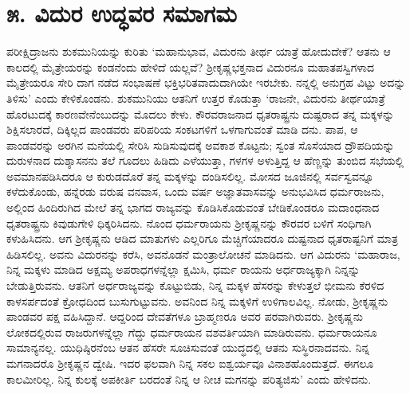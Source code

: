 
\chapter{೫. ವಿದುರ ಉದ್ಧವರ ಸಮಾಗಮ}

ಪರೀಕ್ಷಿದ್ರಾಜನು ಶುಕಮುನಿಯನ್ನು ಕುರಿತು ‘ಮಹಾನುಭಾವ, ವಿದುರನು ತೀರ್ಥ ಯಾತ್ರೆ ಹೋದುದೇಕೆ? ಆತನು ಆ ಕಾಲದಲ್ಲಿ ಮೈತ್ರೇಯರನ್ನು ಕಂಡನೆಂದು ಹೇಳಿದೆ ಯಲ್ಲವೆ? ಶ್ರೀಕೃಷ್ಣಭಕ್ತನಾದ ವಿದುರನೂ ಮಹಾತಪಸ್ವಿಗಳಾದ ಮೈತ್ರೇಯರೂ ಸೇರಿ ದಾಗ ನಡೆದ ಸಂಭಾಷಣೆ ಭಕ್ತಿಭರಿತವಾದುದಾಗಿಯೇ ಇರಬೇಕು. ನನ್ನಲ್ಲಿ ಅನುಗ್ರಹ ವಿಟ್ಟು ಅದನ್ನು ತಿಳಿಸು’ ಎಂದು ಕೇಳಿಕೊಂಡನು. ಶುಕಮುನಿಯು ಆತನಿಗೆ ಉತ್ತರ ಕೊಡುತ್ತಾ ‘ರಾಜನೇ, ವಿದುರನು ತೀರ್ಥಯಾತ್ರೆ ಹೊರಟುದಕ್ಕೆ ಕಾರಣವೇನೆಂಬುದನ್ನು ಮೊದಲು ಕೇಳು. ಕೌರವರಾಜನಾದ ಧೃತರಾಷ್ಟ್ರನು ದುಷ್ಟರಾದ ತನ್ನ ಮಕ್ಕಳನ್ನು ಶಿಕ್ಷಿಸಲಾರದೆ, ದಿಕ್ಕಿಲ್ಲದ ಪಾಂಡವರು ಪರಿಪರಿಯ ಸಂಕಟಗಳಿಗೆ ಒಳಗಾಗುವಂತೆ ಮಾಡಿ ದನು. ಪಾಪ, ಆ ಪಾಂಡವರನ್ನು ಅರಗಿನ ಮನೆಯಲ್ಲಿ ಸೇರಿಸಿ ಸುಡಿಸುವುದಕ್ಕೆ ಅವಕಾಶ ಕೊಟ್ಟನು; ಸ್ವಂತ ಸೊಸೆಯಾದ ದ್ರೌಪದಿಯನ್ನು ದುರುಳನಾದ ದುಶ್ಶಾಸನನು ತಲೆ ಗೂದಲು ಹಿಡಿದು ಎಳೆಯುತ್ತಾ, ಗಳಗಳ ಅಳುತ್ತಿದ್ದ ಆ ಹೆಣ್ಣನ್ನು ತುಂಬಿದ ಸಭೆಯಲ್ಲಿ ಅವಮಾನಪಡಿಸಿದರೂ ಆ ಕುರುಡದೊರೆ ತನ್ನ ಮಕ್ಕಳನ್ನು ದಂಡಿಸಲಿಲ್ಲ. ಮೋಸದ ಜೂಜಿನಲ್ಲಿ ಸರ್ವಸ್ವವನ್ನೂ ಕಳೆದುಕೊಂಡು, ಹನ್ನೆರಡು ವರುಷ ವನವಾಸ, ಒಂದು ವರ್ಷ ಅಜ್ಞಾತವಾಸವನ್ನು ಅನುಭವಿಸಿದ ಧರ್ಮರಾಜನು, ಅಲ್ಲಿಂದ ಹಿಂದಿರುಗಿದ ಮೇಲೆ ತನ್ನ ಭಾಗದ ರಾಜ್ಯವನ್ನು ಕೊಡಿಸಿಕೊಡುವಂತೆ ಬೇಡಿಕೊಂಡರೂ ಮದಾಂಧನಾದ ಧೃತರಾಷ್ಟ್ರನು ಕಿವುಡುಗೇಳಿ ಧಿಕ್ಕರಿಸಿದನು. ನೊಂದ ಧರ್ಮರಾಯನು ಶ್ರೀಕೃಷ್ಣನನ್ನು ಕೌರವರ ಬಳಿಗೆ ಸಂಧಿಗಾಗಿ ಕಳುಹಿಸಿದನು. ಆಗ ಶ್ರೀಕೃಷ್ಣನು ಆಡಿದ ಮಾತುಗಳು ಎಲ್ಲರಿಗೂ ಮೆಚ್ಚಿಗೆಯಾದರೂ ದುಷ್ಟನಾದ ಧೃತರಾಷ್ಟನಿಗೆ ಮಾತ್ರ ಹಿಡಿಸಲಿಲ್ಲ. ಅವನು ವಿದುರನನ್ನು ಕರೆಸಿ, ಅವನೊಡನೆ ಮಂತ್ರಾಲೋಚನೆ ಮಾಡಿದನು. ಆಗ ವಿದುರನು ‘ಮಹಾರಾಜ, ನಿನ್ನ ಮಕ್ಕಳು ಮಾಡಿದ ಅಕ್ಷಮ್ಯ ಅಪರಾಧಗಳನ್ನೆಲ್ಲಾ ಕ್ಷಮಿಸಿ, ಧರ್ಮ ರಾಯನು ಅರ್ಧರಾಜ್ಯಕ್ಕಾಗಿ ನಿನ್ನನ್ನು ಬೇಡುತ್ತಿರುವನು. ಆತನಿಗೆ ಅರ್ಧರಾಜ್ಯವನ್ನು ಕೊಟ್ಟುಬಿಡು, ನಿನ್ನ ಮಕ್ಕಳ ಹೆಸರನ್ನು ಕೇಳುತ್ತಲೆ ಭೀಮನು ಕೆರಳಿದ ಕಾಳಸರ್ಪದಂತೆ ಕ್ರೋಧದಿಂದ ಬುಸುಗುಟ್ಟುವನು. ಅವನಿಂದ ನಿನ್ನ ಮಕ್ಕಳಿಗೆ ಉಳಿಗಾಲವಿಲ್ಲ. ನೋಡು, ಶ್ರೀಕೃಷ್ಣನು ಪಾಂಡವರ ಪಕ್ಷ ವಹಿಸಿದ್ದಾನೆ. ಆದ್ದರಿಂದ ದೇವತೆಗಳೂ ಬ್ರಾಹ್ಮಣರೂ ಅವರ ಪರವಾಗಿರುವರು. ಶ್ರೀಕೃಷ್ಣನು ಲೋಕದಲ್ಲಿರುವ ರಾಜರುಗಳನ್ನೆಲ್ಲಾ ಗೆದ್ದು ಧರ್ಮರಾಯನ ವಶವರ್ತಿಯಾಗಿ ಮಾಡಿರುವನು. ಧರ್ಮರಾಯನೂ ಸಾಮಾನ್ಯನಲ್ಲ. ಯುಧಿಷ್ಠಿರನೆಂಬ ಆತನ ಹೆಸರೇ ಸೂಚಿಸುವಂತೆ ಯುದ್ಧದಲ್ಲಿ ಆತನು ಸುಸ್ಥಿರನಾದವನು. ನಿನ್ನ ಮಗನಾದರೊ ಶ್ರೀಕೃಷ್ಣನ ದ್ವೇಷಿ. ಇದರ ಫಲವಾಗಿ ನಿನ್ನ ಸಕಲ ಐಶ್ವರ್ಯವೂ ವಿನಾಶಹೊಂದುತ್ತದೆ. ಈಗಲೂ ಕಾಲಮೀರಿಲ್ಲ. ನಿನ್ನ ಕುಲಕ್ಕೆ ಅಪಕೀರ್ತಿ ಬರದಂತೆ ನಿನ್ನ ಆ ನೀಚ ಮಗನನ್ನು ಪರಿತ್ಯಜಿಸು’ ಎಂದು ಹೇಳಿದನು.

